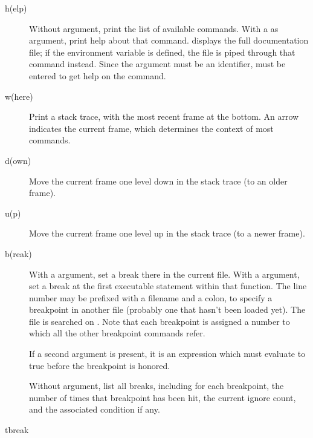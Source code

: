 \begin{description}

\item[h(elp) ]

Without argument, print the list of available commands.  With a
 as argument, print help about that command.   displays the full documentation file; if the environment variable
 is defined, the file is piped through that command
instead.  Since the  argument must be an identifier,
 must be entered to get help on the \samp{!} command.

\item[w(here)]

Print a stack trace, with the most recent frame at the bottom.  An
arrow indicates the current frame, which determines the context of
most commands.

\item[d(own)]

Move the current frame one level down in the stack trace
(to an older frame).

\item[u(p)]

Move the current frame one level up in the stack trace
(to a newer frame).

\item[b(reak) ]

With a  argument, set a break there in the current
file.  With a  argument, set a break at the first
executable statement within that function.
The line number may be prefixed with a filename and a colon,
to specify a breakpoint in another file (probably one that
hasn't been loaded yet).  The file is searched on .
Note that each breakpoint is assigned a number to which all the other
breakpoint commands refer.

If a second argument is present, it is an expression which must
evaluate to true before the breakpoint is honored.

Without argument, list all breaks, including for each breakpoint,
the number of times that breakpoint has been hit, the current
ignore count, and the associated condition if any.

\item[tbreak ]


\end{description}
